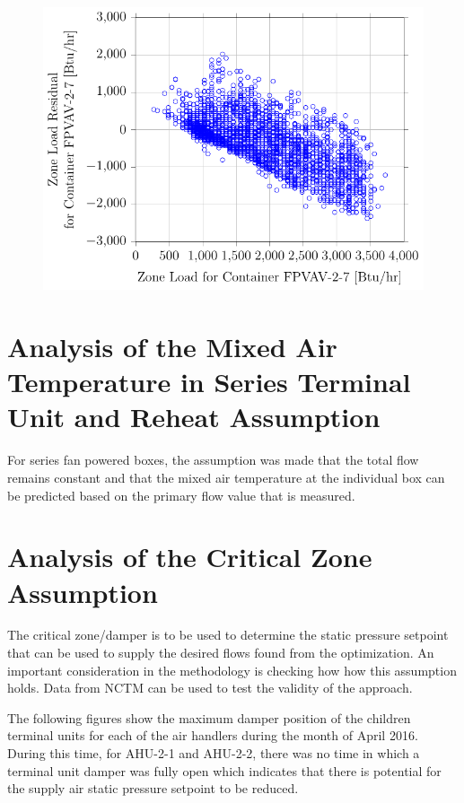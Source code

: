 \begin{figure}
\centering
\includegraphics[]{Plots/2016-09-14-1020-ZoneLoadResidualforContainerFPVAV27vsZoneLoadforContainerFPVAV27.pdf}
\caption{  }
\label{fig:2016-09-14-1020-ZoneLoadResidualforContainerFPVAV27vsZoneLoadforContainerFPVAV27}
\end{figure}


\section{Analysis of the Mixed Air Temperature in Series Terminal Unit and Reheat Assumption}

For series fan powered boxes, the assumption was made that the total flow remains constant and that the mixed air temperature at the individual box can be predicted based on the primary flow value that is measured. 


\section{Analysis of the Critical Zone Assumption}

The critical zone/damper is to be used to determine the static pressure setpoint that can be used to supply the desired flows found from the optimization. An important consideration in the methodology is checking how how this assumption holds. Data from NCTM can be used to test the validity of the approach.

The following figures show the maximum damper position of the children terminal units for each of the air handlers during the month of April 2016. During this time, for AHU-2-1 and AHU-2-2, there was no time in which a terminal unit damper was fully open which indicates that there is potential for the supply air static pressure setpoint to be reduced.  

